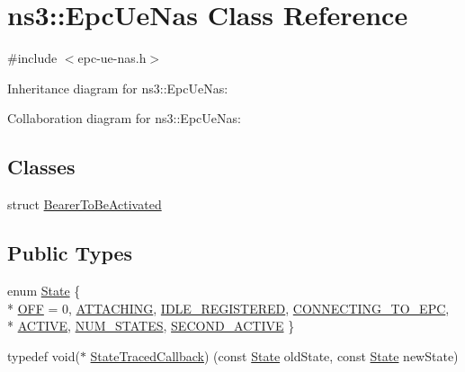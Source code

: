 \hypertarget{classns3_1_1EpcUeNas}{}\section{ns3\+:\+:Epc\+Ue\+Nas Class Reference}
\label{classns3_1_1EpcUeNas}


{\ttfamily \#include $<$epc-\/ue-\/nas.\+h$>$}



Inheritance diagram for ns3\+:\+:Epc\+Ue\+Nas\+:


Collaboration diagram for ns3\+:\+:Epc\+Ue\+Nas\+:
\subsection*{Classes}
\begin{DoxyCompactItemize}
\item 
struct \hyperlink{structns3_1_1EpcUeNas_1_1BearerToBeActivated}{Bearer\+To\+Be\+Activated}
\end{DoxyCompactItemize}
\subsection*{Public Types}
\begin{DoxyCompactItemize}
\item 
enum \hyperlink{classns3_1_1EpcUeNas_a8047255fecfac11c9e1abe6f13d527dc}{State} \{ \\*
\hyperlink{classns3_1_1EpcUeNas_a8047255fecfac11c9e1abe6f13d527dca5365f25c9adbe678285b298023dcfd40}{O\+FF} = 0, 
\hyperlink{classns3_1_1EpcUeNas_a8047255fecfac11c9e1abe6f13d527dcac3ce181dcf002a15840b4d3f6389b8bd}{A\+T\+T\+A\+C\+H\+I\+NG}, 
\hyperlink{classns3_1_1EpcUeNas_a8047255fecfac11c9e1abe6f13d527dcad35816dc25bbf6b102cb071b676cbe0d}{I\+D\+L\+E\+\_\+\+R\+E\+G\+I\+S\+T\+E\+R\+ED}, 
\hyperlink{classns3_1_1EpcUeNas_a8047255fecfac11c9e1abe6f13d527dcab4a6bb3f96f06bdd9d01511754481b44}{C\+O\+N\+N\+E\+C\+T\+I\+N\+G\+\_\+\+T\+O\+\_\+\+E\+PC}, 
\\*
\hyperlink{classns3_1_1EpcUeNas_a8047255fecfac11c9e1abe6f13d527dcaf80ef9922299d94e3623f0746cb478cc}{A\+C\+T\+I\+VE}, 
\hyperlink{classns3_1_1EpcUeNas_a8047255fecfac11c9e1abe6f13d527dcab36b147d1b905a637b5902e12ea4e825}{N\+U\+M\+\_\+\+S\+T\+A\+T\+ES}, 
\hyperlink{classns3_1_1EpcUeNas_a8047255fecfac11c9e1abe6f13d527dca030e2ae6d3c62c94c68fadd74bf5bf95}{S\+E\+C\+O\+N\+D\+\_\+\+A\+C\+T\+I\+VE}
 \}
\item 
typedef void($\ast$ \hyperlink{classns3_1_1EpcUeNas_afa8d2efdc3cdbd99fe97d99a5ae34ffd}{State\+Traced\+Callback}) (const \hyperlink{classns3_1_1EpcUeNas_a8047255fecfac11c9e1abe6f13d527dc}{State} old\+State, const \hyperlink{classns3_1_1EpcUeNas_a8047255fecfac11c9e1abe6f13d527dc}{State} new\+State)
\end{DoxyCompactItemize}
